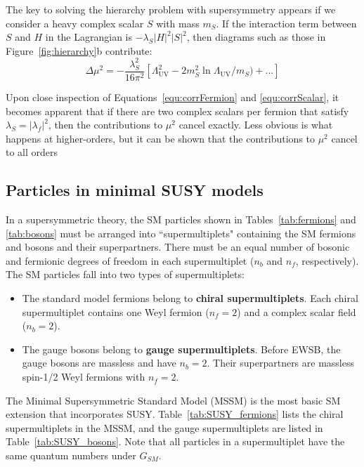The key to solving the hierarchy problem with supersymmetry appears if we consider a heavy complex scalar $S$ with mass $m_S$. If the interaction term between $S$ and $H$ in the Lagrangian is $-\lambda_S|H|^2|S|^2$, then diagrams such as those in Figure~\ref{fig:hierarchy}b contribute:
\begin{equation}
\Delta\mu^2 = -\frac{\lambda_S^2}{16\pi^2} [ \Lambda^2_\mathrm{UV} - 2 m_S^2 \ln{\Lambda_\mathrm{UV} / m_S) }+ ... ]
\label{equ:corrScalar}
\end{equation}

Upon close inspection of Equations~\ref{equ:corrFermion} and \ref{equ:corrScalar}, it becomes apparent that if
there are two complex scalars per fermion that satisfy $\lambda_S = |\lambda_f|^2$, then the contributions to $\mu^2$ cancel exactly. 
Less obvious is what happens at higher-orders, but it can be shown that 
the contributions to $\mu^2$ cancel to all orders


\subsection{Particles in minimal SUSY models}
\label{sec:SUSYparticles}
In a supersymmetric theory, the SM particles shown in Tables~\ref{tab:fermions} and \ref{tab:bosons} must be arranged into ``supermultiplets" containing the SM fermions and bosons and their superpartners. There must be an equal number of bosonic and fermionic degrees of freedom in each supermultiplet ($n_b$ and $n_f$, respectively). The SM particles fall into two types of supermultiplets:
\begin{itemize}
\item The standard model fermions belong to \textbf{chiral supermultiplets}. Each chiral supermultiplet contains one Weyl fermion ($n_f = 2$) and a complex scalar field ($n_b = 2$).
\item The gauge bosons belong to \textbf{gauge supermultiplets}. Before EWSB, the gauge bosons are massless and have $n_b = 2$. Their superpartners are massless spin-1/2 Weyl fermions with $n_f = 2$. 
\end{itemize}

The Minimal Supersymmetric Standard Model (MSSM) is the most basic SM extension that incorporates SUSY. Table~\ref{tab:SUSY_fermions} lists the chiral supermultiplets in the MSSM, and the gauge supermultiplets are listed in Table~\ref{tab:SUSY_bosons}. Note that all particles in a supermultiplet have the same quantum numbers under $G_{SM}$. 

